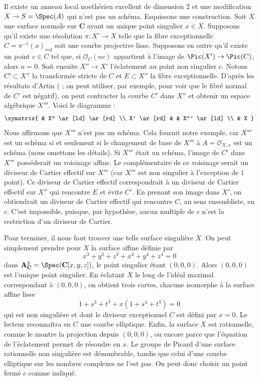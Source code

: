 \begin{example}
\label{example-not-blow-up}
Il existe un anneau local noethérien excellent de dimension $2$ et une
modification $X \to S = \Spec(A)$ qui n'est pas un schéma.
Esquissons une construction. Soit $X$ une surface normale sur $\mathbf{C}$
ayant un unique point singulier $x \in X$. Supposons qu'il existe une
résolution $\pi : X' \to X$ telle que la fibre exceptionnelle
$C = \pi^{-1}(x)_{red}$ soit une courbe projective lisse. Supposons en outre
qu'il existe un point $c \in C$ tel que, si $\mathcal{O}_C(nc)$ appartient à
l'image de $\Pic(X') \to \Pic(C)$, alors $n = 0$.
Soit ensuite $X'' \to X'$ l'éclatement au point non singulier $c$.
Notons $C' \subset X''$ la transformée stricte de $C$ et $E \subset X''$ la
fibre exceptionnelle. D'après les résultats d'Artin
(\cite{ArtinII} ; on peut utiliser, par exemple, \cite{Mumford-topology} pour
voir que le fibré normal de $C'$ est négatif), on peut contracter la courbe
$C'$ dans $X''$ et obtenir un espace algébrique $X'''$. Voici le diagramme :
$$
\xymatrix{
& X'' \ar[ld] \ar[rd] \\
X' \ar[rd] &  & X''' \ar[ld] \\
& X
}
$$
Nous affirmons que $X'''$ n'est pas un schéma. Cela fournit notre exemple,
car $X'''$ est un schéma si et seulement si le changement de base de $X'''$
à $A = \mathcal{O}_{X, x}$ est un schéma (nous omettons les détails).
Si $X'''$ était un schéma, l'image de $C'$ dans $X'''$ posséderait un voisinage
affine. Le complémentaire de ce voisinage serait un diviseur de Cartier
effectif sur $X'''$ (car $X'''$ est non singulier à l'exception de $1$ point).
Ce diviseur de Cartier effectif correspondrait à un diviseur de Cartier
effectif sur $X''$ qui rencontre $E$ et évite $C'$. En prenant son image dans
$X'$, on obtiendrait un diviseur de Cartier effectif qui rencontre $C$, au sens
ensembliste, en $c$. C'est impossible, puisque, par hypothèse, aucun multiple
de $c$ n'est la restriction d'un diviseur de Cartier.

\medskip\noindent
Pour terminer, il nous faut trouver une telle surface singulière $X$. On peut
simplement prendre pour $X$ la surface affine définie par
$$
x^3 + y^3 + z^3 + x^4 + y^4 + z^4 = 0
$$
dans $\mathbf{A}^3_\mathbf{C} = \Spec(\mathbf{C}[x, y, z])$, le point
singulier étant $(0, 0, 0)$. Alors $(0, 0, 0)$ est l'unique point singulier.
En éclatant $X$ le long de l'idéal maximal correspondant à $(0, 0, 0)$, on
obtient trois cartes, chacune isomorphe à la surface affine lisse
$$
1 + s^3 + t^3 + x(1 + s^4 + t^4) = 0
$$
qui est non singulière et dont le diviseur exceptionnel $C$ est défini par
$x = 0$. Le lecteur reconnaîtra en $C$ une courbe elliptique. Enfin, la
surface $X$ est rationnelle, comme le montre la projection depuis $(0, 0, 0)$,
ou encore parce que l'équation de l'éclatement permet de résoudre en $x$.
Le groupe de Picard d'une surface rationnelle non singulière est dénombrable,
tandis que celui d'une courbe elliptique sur les nombres complexes ne l'est
pas. On peut donc choisir un point fermé $c$ comme indiqué.
\end{example}














